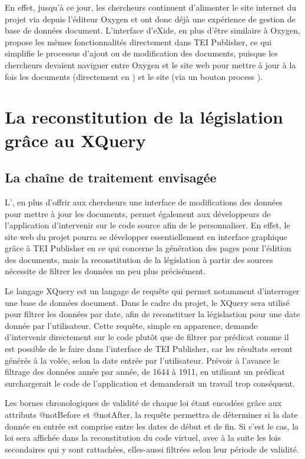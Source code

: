 En effet, jusqu'à ce jour, les chercheurs continuent d'alimenter le site internet du projet \LSC via \FTP depuis l'éditeur \XML Oxygen et ont donc déjà une expérience de gestion de base de données document. L'interface d'eXide, en plus d'être similaire à Oxygen, propose les mêmes fonctionnalités directement dans TEI Publisher, ce qui simplifie le processus d'ajout ou de modification des documents, puisque les chercheurs devaient naviguer entre Oxygen et le site web \LSC pour mettre à jour à la fois les documents (directement en \XML) et le site (via un bouton \og process \XML \fg). 

 \section{La reconstitution de la législation grâce au XQuery}
    \subsection{La chaîne de traitement envisagée}
L'\IDE, en plus d'offrir aux chercheurs une interface de modifications des données \XML pour mettre à jour les documents, permet également aux développeurs de l'application d'intervenir sur le code source afin de le personnaliser. En effet, le site web du projet pourra se développer essentiellement en interface graphique grâce à TEI Publisher en ce qui concerne la génération des pages \HTML pour l'édition des documents, mais la reconstitution de la législation à partir des sources nécessite de filtrer les données un peu plus précisément. 

Le langage XQuery est un langage de requête qui permet notamment d'interroger une base de données document. Dans le cadre du projet, le XQuery sera utilisé pour filtrer les données \XML par date, afin de reconstituer la législastion pour une date donnée par l'utilisateur. Cette requête, simple en apparence, demande d'intervenir directement sur le code plutôt que de filtrer par prédicat comme il est possible de le faire dans l'interface de TEI Publisher, car les résultats seront générés à la volée, selon la date entrée par l'utilisateur. Prévoir à l'avance le filtrage des données année par année, de 1644 à 1911, en utilisant un prédicat surchargerait le code de l'application et demanderait un travail trop conséquent. 

Les bornes chronologiques de validité de chaque loi étant encodées grâce aux attributs @notBefore et @notAfter, la requête permettra de déterminer si la date donnée en entrée est comprise entre les dates de début et de fin. Si c'est le cas, la loi sera affichée dans la reconstitution du code virtuel, avec à la suite les lois secondaires qui y sont rattachées, elles-aussi filtrées selon leur période de validité.

